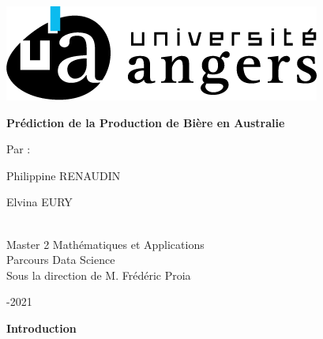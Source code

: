 \documentclass[12pt,a4paper]{book}
\newcommand{\1}{\mathds{1}}
\begin{document}
	
\begin{titlepage}
	\thispagestyle{empty}
	\begin{center}
	
    \includegraphics[scale=1.]{Logo}  
	\vspace{1 cm}

	
	\vspace{0.7 cm}
	\textbf{{\fontsize{26}{34} \selectfont Prédiction de la Production de Bière en Australie }}\\
	\vspace{1 cm}
	 
	
	\vspace{1.5 cm}
	{\fontsize{15}{25} \selectfont Par : \\
		\item Philippine RENAUDIN
		\item Elvina EURY
	}\\
	\vspace{0.5 cm}
	{\fontsize{15}{25} \selectfont Master 2 Mathématiques et Applications}\\
	{\fontsize{15}{25} \selectfont Parcours Data Science}\\
	\vspace{1 cm}
	{\fontsize{10}{25} \selectfont Sous la direction de M. Frédéric Proia}
	\vspace{1.5 cm}

	{\fontsize{20}{30} -2021}\\
	
	\end{center}
\end{titlepage}

\thispagestyle{empty}
\newpage





\newpage
\setcounter{page}{1}

\noindent
{\LARGE \textbf{Introduction}}
\vspace{5 mm}

\end{document}
